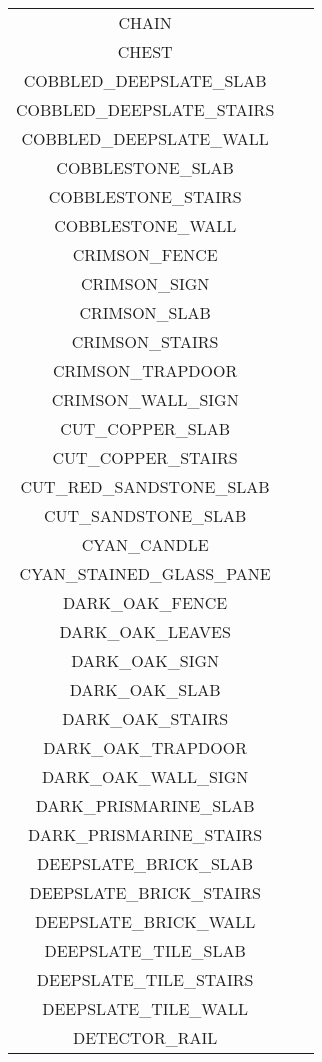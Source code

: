 \documentclass[11pt]{article}
\newcommand{\xmark}{\ding{55}}%
\begin{document}
\begin{longtable}{ |c|c|c| }
	CHAIN & \xmark \\
	CHEST & \xmark \\
	COBBLED\_DEEPSLATE\_SLAB & \xmark \\
	COBBLED\_DEEPSLATE\_STAIRS & \xmark \\
	COBBLED\_DEEPSLATE\_WALL & \xmark \\
	COBBLESTONE\_SLAB & \xmark \\
	COBBLESTONE\_STAIRS & \xmark \\
	COBBLESTONE\_WALL & \xmark \\
	CRIMSON\_FENCE & \xmark \\
	CRIMSON\_SIGN & \xmark \\
	CRIMSON\_SLAB & \xmark \\
	CRIMSON\_STAIRS & \xmark \\
	CRIMSON\_TRAPDOOR & \xmark \\
	CRIMSON\_WALL\_SIGN & \xmark \\
	CUT\_COPPER\_SLAB & \xmark \\
	CUT\_COPPER\_STAIRS & \xmark \\
	CUT\_RED\_SANDSTONE\_SLAB & \xmark \\
	CUT\_SANDSTONE\_SLAB & \xmark \\
	CYAN\_CANDLE & \xmark \\
	CYAN\_STAINED\_GLASS\_PANE & \xmark \\
	DARK\_OAK\_FENCE & \xmark \\
	DARK\_OAK\_LEAVES & \xmark \\
	DARK\_OAK\_SIGN & \xmark \\
	DARK\_OAK\_SLAB & \xmark \\
	DARK\_OAK\_STAIRS & \xmark \\
	DARK\_OAK\_TRAPDOOR & \xmark \\
	DARK\_OAK\_WALL\_SIGN & \xmark \\
	DARK\_PRISMARINE\_SLAB & \xmark \\
	DARK\_PRISMARINE\_STAIRS & \xmark \\
	DEEPSLATE\_BRICK\_SLAB & \xmark \\
	DEEPSLATE\_BRICK\_STAIRS & \xmark \\
	DEEPSLATE\_BRICK\_WALL & \xmark \\
	DEEPSLATE\_TILE\_SLAB & \xmark \\
	DEEPSLATE\_TILE\_STAIRS & \xmark \\
	DEEPSLATE\_TILE\_WALL & \xmark \\
	DETECTOR\_RAIL & \xmark \\

\end{longtable}
\end{document}
